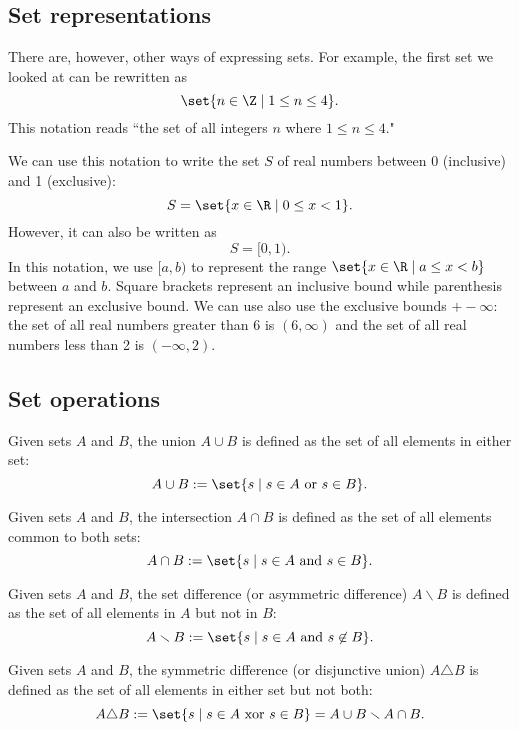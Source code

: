 \documentclass[12pt,paper=letter]{scrartcl}
\begin{document}
    \subsection{Set representations}
    There are, however,
    other ways of expressing sets.
    For example,
    the first set we looked at can be rewritten as
    \[
        \set{n\in\Z\mid 1\leq n\leq 4}.
    \]
    This notation reads ``the set of all integers $n$ where $1\leq n\leq 4$."

    \pnp

    We can use this notation to write the set $S$ of real numbers between 0 (inclusive) and 1 (exclusive):
    \[
        S = \set{x\in\R\mid 0\leq x<1}.
    \]
    However,
    it can also be written as
    \[
        S = [0,1).
    \]
    In this notation,
    we use $[a,b)$ to represent the range $\set{x\in\R\mid a\leq x<b}$ between $a$ and $b$.
    Square brackets represent an inclusive bound while parenthesis represent an exclusive bound.
    We can use also use the exclusive bounds $+-\infty$:
    the set of all real numbers greater than 6 is $(6,\infty)$ and the set of all real numbers less than 2 is $(-\infty,2)$.

    \subsection{Set operations}

    \begin{defboxed}
        Given sets $A$ and $B$,
        the union $A\cup B$ is defined as the set of all elements in either set:
        \[
            A\cup B := \set{s\mid s\in A \text{ or } s\in B}.
        \]
    \end{defboxed}
    \begin{defboxed}
        Given sets $A$ and $B$,
        the intersection $A\cap B$ is defined as the set of all elements common to both sets:
        \[
            A\cap B := \set{s\mid s\in A \text{ and } s\in B}.
        \]
    \end{defboxed}
    \begin{defboxed}
        Given sets $A$ and $B$,
        the set difference (or asymmetric difference) $A\smallsetminus B$ is defined as the set of all elements in $A$ but not in $B$:
        \[
            A\smallsetminus B := \set{s\mid s\in A \text{ and } s\not\in B}.
        \]
    \end{defboxed}
    \begin{defboxed}
        Given sets $A$ and $B$,
        the symmetric difference (or disjunctive union) $A\triangle B$ is defined as the set of all elements in either set but not both:
        \[
            A\triangle B := \set{s\mid s\in A \text{ xor } s\in B} = A\cup B \smallsetminus A\cap B.
        \]
    \end{defboxed}
\end{document}
